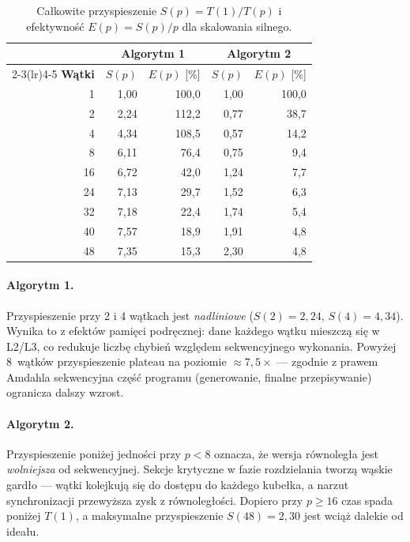 \documentclass[12pt, a4paper]{article}
\begin{document}
\begin{table}[H]
  \centering
  \caption{Całkowite przyspieszenie $S(p) = T(1)/T(p)$ i efektywność $E(p) = S(p)/p$
           dla skalowania silnego.}
  \label{tab:speedup_strong}
  \begin{tabular}{r rr rr}
    \toprule
    & \multicolumn{2}{c}{\textbf{Algorytm 1}} & \multicolumn{2}{c}{\textbf{Algorytm 2}} \\
    \cmidrule(lr){2-3}\cmidrule(lr){4-5}
    \textbf{Wątki} & $S(p)$ & $E(p)$ [\%] & $S(p)$ & $E(p)$ [\%] \\
    \midrule
     1  & 1{,}00 & 100{,}0 & 1{,}00 & 100{,}0 \\
     2  & 2{,}24 & 112{,}2 & 0{,}77 &  38{,}7 \\
     4  & 4{,}34 & 108{,}5 & 0{,}57 &  14{,}2 \\
     8  & 6{,}11 &  76{,}4 & 0{,}75 &   9{,}4 \\
    16  & 6{,}72 &  42{,}0 & 1{,}24 &   7{,}7 \\
    24  & 7{,}13 &  29{,}7 & 1{,}52 &   6{,}3 \\
    32  & 7{,}18 &  22{,}4 & 1{,}74 &   5{,}4 \\
    40  & 7{,}57 &  18{,}9 & 1{,}91 &   4{,}8 \\
    48  & 7{,}35 &  15{,}3 & 2{,}30 &   4{,}8 \\
    \bottomrule
  \end{tabular}
\end{table}

\paragraph{Algorytm 1.}
Przyspieszenie przy 2 i 4 wątkach jest \emph{nadliniowe} ($S(2)=2{,}24$,
$S(4)=4{,}34$).
Wynika to z efektów pamięci podręcznej: dane każdego wątku mieszczą się
w L2/L3, co redukuje liczbę chybień względem sekwencyjnego wykonania.
Powyżej 8~wątków przyspieszenie plateau na poziomie $\approx\!7{,}5\times$
— zgodnie z prawem Amdahla sekwencyjna część programu (generowanie, finalne
przepisywanie) ogranicza dalszy wzrost.

\paragraph{Algorytm 2.}
Przyspieszenie poniżej jedności przy $p<8$ oznacza, że wersja równoległa jest
\emph{wolniejsza} od sekwencyjnej.
Sekcje krytyczne w fazie rozdzielania tworzą wąskie gardło — wątki kolejkują
się do dostępu do każdego kubełka, a narzut synchronizacji przewyższa zysk
z równoległości.
Dopiero przy $p \ge 16$ czas spada poniżej $T(1)$, a maksymalne przyspieszenie
$S(48)=2{,}30$ jest wciąż dalekie od ideału.
\end{document}
